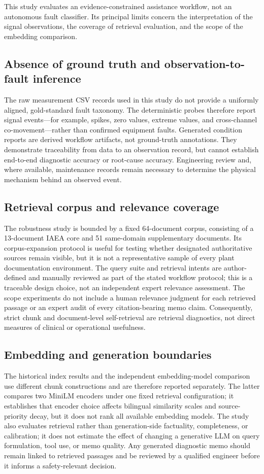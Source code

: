 This study evaluates an evidence-constrained assistance workflow, not an autonomous fault classifier. Its principal limits concern the interpretation of the signal observations, the coverage of retrieval evaluation, and the scope of the embedding comparison.

\subsection{Absence of ground truth and observation-to-fault inference}
The raw measurement CSV records used in this study do not provide a uniformly aligned, gold-standard fault taxonomy. The deterministic probes therefore report signal events---for example, spikes, zero values, extreme values, and cross-channel co-movement---rather than confirmed equipment faults. Generated condition reports are derived workflow artifacts, not ground-truth annotations. They demonstrate traceability from data to an observation record, but cannot establish end-to-end diagnostic accuracy or root-cause accuracy. Engineering review and, where available, maintenance records remain necessary to determine the physical mechanism behind an observed event.

\subsection{Retrieval corpus and relevance coverage}
The robustness study is bounded by a fixed 64-document corpus, consisting of a 13-document IAEA core and 51 same-domain supplementary documents. Its corpus-expansion protocol is useful for testing whether designated authoritative sources remain visible, but it is not a representative sample of every plant documentation environment. The query suite and retrieval intents are author-defined and manually reviewed as part of the stated workflow protocol; this is a traceable design choice, not an independent expert relevance assessment. The scope experiments do not include a human relevance judgment for each retrieved passage or an expert audit of every citation-bearing memo claim. Consequently, strict chunk and document-level self-retrieval are retrieval diagnostics, not direct measures of clinical or operational usefulness.

\subsection{Embedding and generation boundaries}
The historical index results and the independent embedding-model comparison use different chunk constructions and are therefore reported separately. The latter compares two MiniLM encoders under one fixed retrieval configuration; it establishes that encoder choice affects bilingual similarity scales and source-priority decay, but it does not rank all available embedding models. The study also evaluates retrieval rather than generation-side factuality, completeness, or calibration; it does not estimate the effect of changing a generative LLM on query formulation, tool use, or memo quality. Any generated diagnostic memo should remain linked to retrieved passages and be reviewed by a qualified engineer before it informs a safety-relevant decision.

